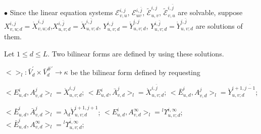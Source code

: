 \def\CTEXPreproc{Created by ctex v0.2.12, don't edit!}\documentclass[11pt]{article}
\begin{document}
\begin{pf}


\noindent $\bullet$ Since the linear equation systems $\mathscr{E}^{i,j}_{v,u}$, $\mathscr{E}^{i,\bar{j}}_{uv}   $,  $ \tilde{\mathscr{E}}^{i,j}_{u,v} $, $ \tilde{\mathscr{E}}^{i,\bar{j}}_{v,u} $ are solvable, suppose $X^{i,j}_{v,u;d}=\mathring{X}^{i,j}_{v,u;d} $,$X^{i,\bar{j}}_{u,v;d}=\mathring{X}^{i,\bar{j}}_{u,v;d}  $,
 $Y^{i,j}_{u,v;d}=\mathring{Y}^{i,j}_{u,v;d}$, $Y^{i,\bar{j}}_{u,v;d}=\mathring{Y}^{i,\bar{j}}_{u,v;d}$ are solutions of them.





 Let $1\leq d\leq L$. Two bilinear forms are defined by using these solutions.


 \noindent $ < >_l : \bar{V}^{'}_{d} \times \bar{V}^{\# '}_{d} \rightarrow \kappa $ be the bilinear form defined by requesting

    \noindent$< E^i _{u,d} , A^j _{v,d}   >_l =\mathring{X}^{i,j}_{u,v;d} $; $< E^i _{u,d} , \bar{A}^j _{v,d}   >_l =\mathring{X}^{i,\bar{j}}_{u,v;d} $; $< \bar{E}^i _{u,d} , A^j _{v,d}   >_l =\mathring{Y}^{i+1,\overline{j-1}}_{u,v;d} $;

    \noindent$< \bar{E}^i _{u,d} , \bar{A}^j _{v,d}   >_l =\lambda_d \mathring{Y}^{i+1,j+1}_{u,v;d} $;  $< E^i _{u,d} , A^{\infty} _{v,d}   >_l ={}^l \Upsilon^{i,\infty}_{u,v;d}$;$< \bar{E}^i _{u,d} , A^{\infty} _{v,d}   >_l ={}^l \Upsilon^{\bar{i} ,\infty}_{u,v;d} $;


\end{pf}
\end{document}
